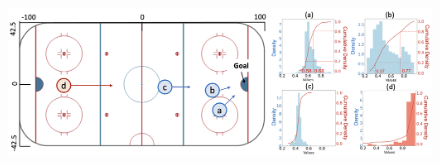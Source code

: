 \documentclass{article}
\begin{document}
\begin{figure}
    \centering
    \includegraphics[scale=0.3]{figures/ice-hockey-rink-updated.png}

\end{figure}
\end{document}
